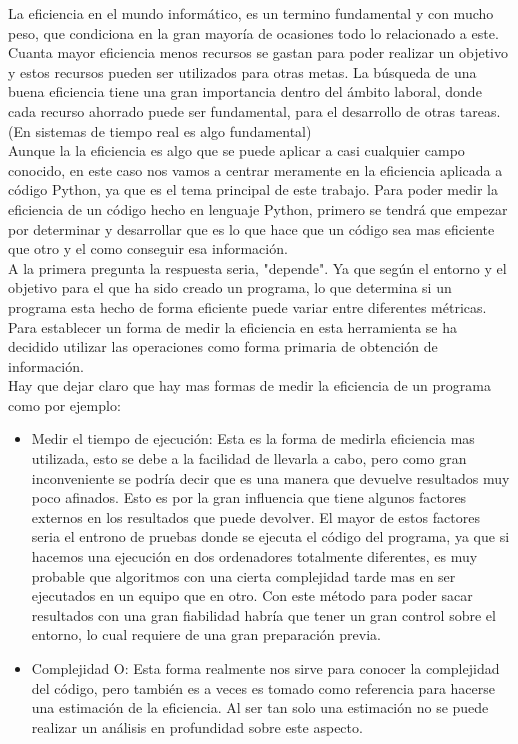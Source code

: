 
La eficiencia en el mundo informático, es un termino fundamental y con mucho peso, que condiciona en la gran mayoría de ocasiones todo lo relacionado a este. Cuanta mayor eficiencia menos recursos se gastan para poder realizar un objetivo y estos recursos pueden ser utilizados para otras metas. 
La búsqueda de una buena eficiencia tiene una gran importancia dentro del ámbito laboral, donde cada recurso ahorrado puede ser fundamental, para el desarrollo de otras tareas. (En sistemas de tiempo real es algo fundamental)\\

Aunque la la eficiencia es algo que se puede aplicar a casi cualquier campo conocido, en este caso nos vamos a centrar meramente en la eficiencia aplicada a código Python, ya que es el tema principal de este trabajo. 
Para poder medir la eficiencia de un código hecho en lenguaje Python, primero se tendrá que empezar por determinar y desarrollar que es lo que hace que un código sea mas eficiente que otro y el como conseguir esa información.\\

A la primera pregunta la respuesta seria, "depende". Ya que según el entorno y el objetivo para el que ha sido creado un programa, lo que determina si un programa esta hecho de forma eficiente puede variar entre diferentes métricas. Para establecer un forma de medir la eficiencia en esta herramienta se ha decidido utilizar las operaciones como forma primaria de obtención de información.\\ 

Hay que dejar claro que hay mas formas de medir la eficiencia de un programa como por ejemplo:
\begin{itemize}
	\item Medir el tiempo de ejecución: Esta es la forma de medirla eficiencia mas utilizada, esto se debe a la facilidad de llevarla a cabo, pero como gran inconveniente se podría decir que es una manera que devuelve resultados muy poco afinados. Esto es por la gran influencia que  tiene algunos factores  externos en los resultados que puede devolver. El mayor de estos factores seria el entrono de pruebas donde se ejecuta el código del programa, ya que si hacemos una ejecución en dos ordenadores totalmente diferentes, es muy probable que algoritmos con una cierta complejidad  tarde mas en ser ejecutados  en un equipo que en otro. Con este  método  para poder sacar resultados con una gran fiabilidad habría que tener un gran control sobre el entorno, lo cual requiere de una gran preparación previa.
	\item Complejidad O: Esta forma realmente nos sirve  para conocer la complejidad del código, pero también es a veces es tomado como referencia para hacerse una estimación de la eficiencia. Al ser tan solo una estimación no se puede realizar un análisis en profundidad sobre este aspecto.

\end{itemize}



